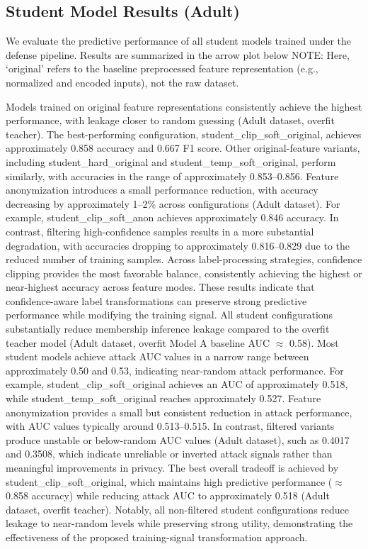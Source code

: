 \documentclass[conference]{IEEEtran}
\begin{document}
\subsection{Student Model Results (Adult)}
We evaluate the predictive performance of all student models trained under the defense pipeline. Results are summarized in the arrow plot below
NOTE: Here, ‘original’ refers to the baseline preprocessed feature representation (e.g., normalized and encoded inputs), not the raw dataset.

Models trained on original feature representations consistently achieve the highest performance, with leakage closer to random guessing (Adult dataset, overfit teacher). The best-performing configuration, student\_clip\_soft\_original, achieves approximately 0.858 accuracy and 0.667 F1 score. Other original-feature variants, including student\_hard\_original and student\_temp\_soft\_original, perform similarly, with accuracies in the range of approximately 0.853--0.856.
Feature anonymization introduces a small performance reduction, with accuracy decreasing by approximately 1--2\% across configurations (Adult dataset). For example, student\_clip\_soft\_anon achieves approximately 0.846 accuracy. In contrast, filtering high-confidence samples results in a more substantial degradation, with accuracies dropping to approximately 0.816--0.829 due to the reduced number of training samples.
Across label-processing strategies, confidence clipping provides the most favorable balance, consistently achieving the highest or near-highest accuracy across feature modes. These results indicate that confidence-aware label transformations can preserve strong predictive performance while modifying the training signal.
All student configurations substantially reduce membership inference leakage compared to the overfit teacher model (Adult dataset, overfit Model A baseline AUC $\approx$ 0.58). Most student models achieve attack AUC values in a narrow range between approximately 0.50 and 0.53, indicating near-random attack performance. For example, student\_clip\_soft\_original achieves an AUC of approximately 0.518, while student\_temp\_soft\_original reaches approximately 0.527.
Feature anonymization provides a small but consistent reduction in attack performance, with AUC values typically around 0.513--0.515. In contrast, filtered variants produce unstable or below-random AUC values (Adult dataset), such as 0.4017 and 0.3508, which indicate unreliable or inverted attack signals rather than meaningful improvements in privacy.
The best overall tradeoff is achieved by student\_clip\_soft\_original, which maintains high predictive performance ($\approx$0.858 accuracy) while reducing attack AUC to approximately 0.518 (Adult dataset, overfit teacher). Notably, all non-filtered student configurations reduce leakage to near-random levels while preserving strong utility, demonstrating the effectiveness of the proposed training-signal transformation approach.
\end{document}
